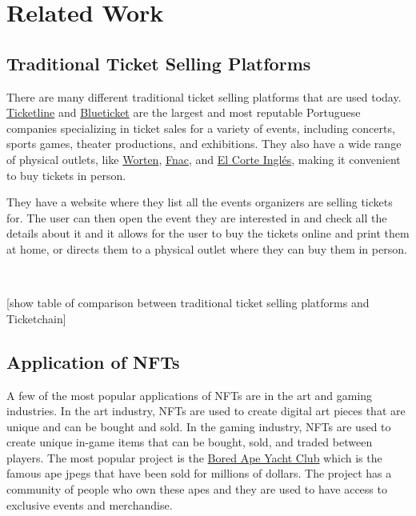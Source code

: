 \section{Related Work}

\subsection{Traditional Ticket Selling Platforms}

There are many different traditional ticket selling platforms that are used today. \href{https://ticketline.sapo.pt/}{Ticketline} and \href{https://blueticket.meo.pt/}{Blueticket} are the largest and most reputable Portuguese companies specializing in ticket sales for a variety of events, including concerts, sports games, theater productions, and exhibitions. They also have a wide range of physical outlets, like \href{https://www.worten.pt/}{Worten}, \href{https://www.fnac.pt/}{Fnac}, and \href{https://www.elcorteingles.pt/}{El Corte Inglés}, making it convenient to buy tickets in person.

They have a website where they list all the events organizers are selling tickets for. The user can then open the event they are interested in and check all the details about it and it allows for the user to buy the tickets online and print them at home, or directs them to a physical outlet where they can buy them in person.

~

[show table of comparison between traditional ticket selling platforms and Ticketchain]

\subsection{Application of NFTs}

A few of the most popular applications of NFTs are in the art and gaming industries. In the art industry, NFTs are used to create digital art pieces that are unique and can be bought and sold. In the gaming industry, NFTs are used to create unique in-game items that can be bought, sold, and traded between players.
The most popular project is the \href{https://www.boredapeyachtclub.com/}{Bored Ape Yacht Club} which is the famous ape jpegs that have been sold for millions of dollars. The project has a community of people who own these apes and they are used to have access to exclusive events and merchandise.